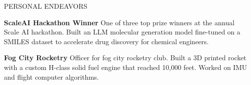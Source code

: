 \documentclass{resume} %
\begin{document}
\begin{rSection}{PERSONAL ENDEAVORS}
\vspace{-0.5em}
\item \textbf{ScaleAI Hackathon Winner} {One of three top prize winners at the annual Scale AI hackathon. Built an LLM molecular generation model fine-tuned on a SMILES dataset to accelerate drug discovery for chemical engineers.}
\item \textbf{Fog City Rocketry} {Officer for fog city rocketry club. Built a 3D printed rocket with a custom H-class solid fuel engine that reached 10,000 feet. Worked on IMU and flight computer algorithms.}
\end{rSection} 
\end{document}
